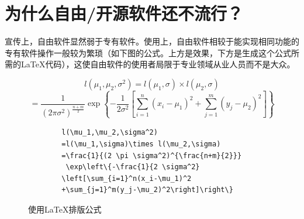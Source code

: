 \section{为什么自由/开源软件还不流行？}
宣传上，自由软件显然弱于专有软件。使用上，自由软件相较于能实现相同功能的专有软件操作一般较为繁琐（如下图的公式。上方是效果，下方是生成这个公式所需的\LaTeX 代码），这使自由软件的使用者局限于专业领域从业人员而不是大众。
\begin{figure}
	\centering\scriptsize
		\[l(\mu_1,\mu_2,\sigma^2)=l(\mu_1,\sigma)\times l(\mu_2,\sigma)\]
		\[=\frac{1}{(2 \pi \sigma^2)^{\frac{n+m}{2}}} \exp\left\{-\frac{1}{2 \sigma^2}\left[\sum_{i=1}^n(x_i-\mu_1)^2+\sum_{j=1}^m(y_j-\mu_2)^2\right]\right\}\]
		\begin{verbatim}
		l(\mu_1,\mu_2,\sigma^2)
		=l(\mu_1,\sigma)\times l(\mu_2,\sigma)
		=\frac{1}{(2 \pi \sigma^2)^{\frac{n+m}{2}}}
		 \exp\left\{-\frac{1}{2 \sigma^2}
		\left[\sum_{i=1}^n(x_i-\mu_1)^2
		+\sum_{j=1}^m(y_j-\mu_2)^2\right]\right\}
		\end{verbatim}
	\caption{使用\LaTeX 排版公式}
\end{figure}